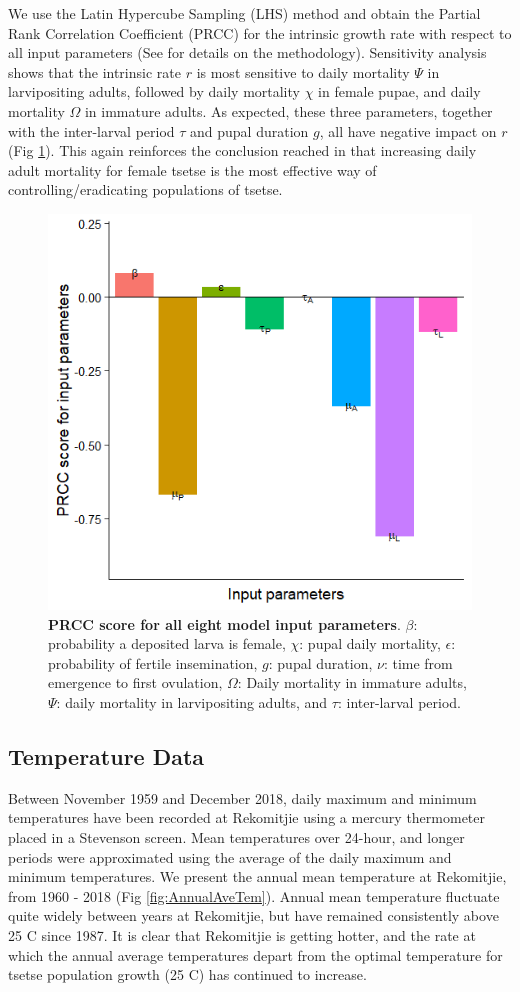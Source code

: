 \documentclass[12pt,a4paper]{article}
\begin{document}
We use the Latin Hypercube Sampling (LHS) method and obtain the Partial Rank Correlation Coefficient (PRCC) for the intrinsic growth rate with respect to all input parameters (See \cite{are2019weakest} for details on the methodology).  Sensitivity analysis shows that the intrinsic rate $r$ is most sensitive to daily mortality $\Psi$ in larvipositing adults, followed by daily mortality $\chi$ in female pupae, and daily mortality $\Omega$ in immature adults. As expected, these three parameters, together with the inter-larval period $\tau$ and pupal duration $g$, all have negative impact on $r$ (Fig \ref{fig:SensitivityPlot}). This again reinforces the conclusion reached in \cite{are2019weakest} that increasing daily adult mortality for female tsetse is the most effective way of controlling/eradicating populations of tsetse.   



\begin{figure}[hbt!]
	\centering
	\includegraphics[width=0.7\linewidth]{GrowthRateSensitivityPlot}
	\caption{{\bf PRCC score for all eight model input parameters}. $\beta$: probability a deposited larva is female, $\chi$: pupal daily mortality, $\epsilon$: probability of fertile insemination, $g$: pupal duration, $\nu$: time from emergence to first ovulation, $\Omega$: Daily mortality in immature adults, $\Psi$: daily mortality in larvipositing adults, and $\tau$: inter-larval period.}
	\label{fig:SensitivityPlot}
\end{figure}

\subsection*{Temperature Data}
Between November 1959 and December 2018, daily maximum and minimum temperatures have been recorded at Rekomitjie using a mercury thermometer placed in a Stevenson screen.  Mean temperatures over 24-hour, and longer periods were approximated using the average of the daily maximum and minimum temperatures. We present the annual mean temperature at Rekomitjie, from 1960 - 2018 (Fig \ref{fig:AnnualAveTem}). Annual mean temperature  fluctuate quite widely between years at Rekomitjie, but have remained consistently above 25 \degree C since 1987. It is clear that Rekomitjie is getting hotter, and the rate at which the annual average temperatures depart from the optimal temperature for tsetse population growth (25 \degree C) \cite{Are2019} has continued to increase.  
\end{document}
